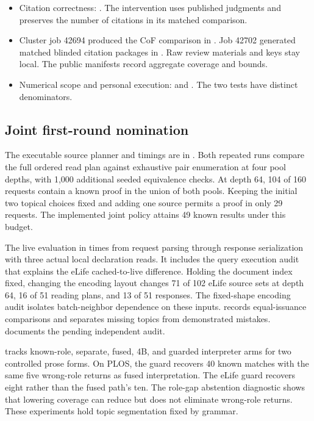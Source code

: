\begin{itemize}
\item Citation correctness: . The intervention uses published judgments and preserves the number of citations in its matched comparison.
\item Cluster job 42694 produced the CoF comparison in . Job 42702 generated matched blinded citation packages in . Raw review materials and keys stay local. The public manifests record aggregate coverage and bounds.
\item Numerical scope and personal execution:  and . The two tests have distinct denominators.
\end{itemize}

\subsection{Joint first-round nomination}
The executable source planner and timings are in . Both repeated runs compare the full ordered read plan against exhaustive pair enumeration at four pool depths, with 1,000 additional seeded equivalence checks. At depth 64, 104 of 160 requests contain a known proof in the union of both pools. Keeping the initial two topical choices fixed and adding one source permits a proof in only 29 requests. The implemented joint policy attains 49 known results under this budget.

The live evaluation in  times from request parsing through response serialization with three actual local declaration reads. It includes the query execution audit that explains the eLife cached-to-live difference. Holding the document index fixed, changing the encoding layout changes 71 of 102 eLife source sets at depth 64, 16 of 51 reading plans, and 13 of 51 responses. The fixed-shape encoding audit isolates batch-neighbor dependence on these inputs.  records equal-issuance comparisons and separates missing topics from demonstrated mistakes.  documents the pending independent audit.

 tracks known-role, separate, fused, 4B, and guarded interpreter arms for two controlled prose forms. On PLOS, the guard recovers 40 known matches with the same five wrong-role returns as fused interpretation. The eLife guard recovers eight rather than the fused path's ten. The role-gap abstention diagnostic shows that lowering coverage can reduce but does not eliminate wrong-role returns. These experiments hold topic segmentation fixed by grammar.

